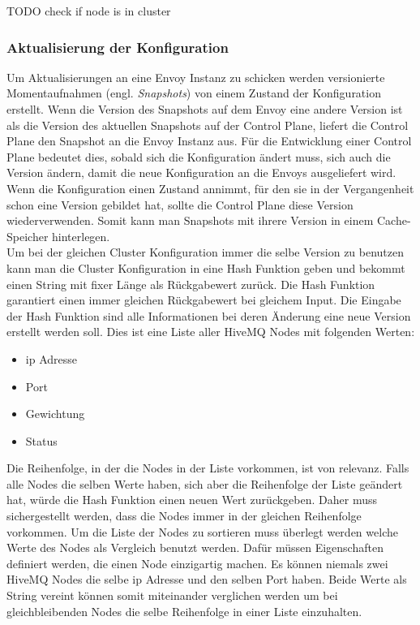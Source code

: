 TODO check if node is in cluster


\subsubsection{Aktualisierung der Konfiguration}
Um Aktualisierungen an eine Envoy Instanz zu schicken werden versionierte Momentaufnahmen (engl. \textit{Snapshots}) von einem Zustand der Konfiguration erstellt. Wenn die Version des Snapshots auf dem Envoy eine andere Version ist als die Version des aktuellen Snapshots auf der Control Plane, liefert die Control Plane den Snapshot an die Envoy Instanz aus.
Für die Entwicklung einer Control Plane bedeutet dies, sobald sich die Konfiguration ändert muss, sich auch die Version ändern, damit die neue Konfiguration an die Envoys ausgeliefert wird. Wenn die Konfiguration einen Zustand annimmt, für den sie in der Vergangenheit schon eine Version gebildet hat, sollte die Control Plane diese Version wiederverwenden. Somit kann man Snapshots mit ihrere Version in einem Cache-Speicher hinterlegen.
\\
Um bei der gleichen Cluster Konfiguration immer die selbe Version zu benutzen kann man die Cluster Konfiguration in eine Hash Funktion geben und bekommt einen String mit fixer Länge als Rückgabewert zurück. Die Hash Funktion garantiert einen immer gleichen Rückgabewert bei gleichem Input.
Die Eingabe der Hash Funktion sind alle Informationen bei deren Änderung eine neue Version erstellt werden soll. Dies ist eine Liste aller HiveMQ Nodes mit folgenden Werten:
\begin{itemize}
  \item \ac{ip} Adresse
  \item Port
  \item Gewichtung
  \item Status
\end{itemize}
Die Reihenfolge, in der die Nodes in der Liste vorkommen, ist von relevanz. Falls alle Nodes die selben Werte haben, sich aber die Reihenfolge der Liste geändert hat, würde die Hash Funktion einen neuen Wert zurückgeben. Daher muss sichergestellt werden, dass die Nodes immer in der gleichen Reihenfolge vorkommen. Um die Liste der Nodes zu sortieren muss überlegt werden welche Werte des Nodes als Vergleich benutzt werden. Dafür müssen Eigenschaften definiert werden, die einen Node einzigartig machen.
Es können niemals zwei HiveMQ Nodes die selbe \ac{ip} Adresse und den selben Port haben. Beide Werte als String vereint können somit miteinander verglichen werden um bei gleichbleibenden Nodes die selbe Reihenfolge in einer Liste einzuhalten.

